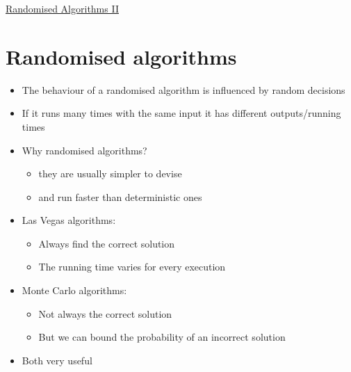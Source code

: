 \documentclass{article}[18pt]
\begin{document}
\begin{center}
\underline{\huge Randomised Algorithms II}
\end{center}
\section{Randomised algorithms}
\begin{itemize}
	\item The behaviour of a randomised algorithm is influenced by random decisions
	\item If it runs many times with the same input it has different outputs/running times
	\item Why randomised algorithms?
	\begin{itemize}
		\item they are usually simpler to devise
		\item and run faster than deterministic ones
	\end{itemize}
	\item Las Vegas algorithms:
	\begin{itemize}
		\item Always find the correct solution
		\item The running time varies for every execution
	\end{itemize}
	\item Monte Carlo algorithms:
	\begin{itemize}
		\item Not always the correct solution
		\item But we can bound the probability of an incorrect solution
	\end{itemize}
	\item Both very useful
\end{itemize}
\end{document}

